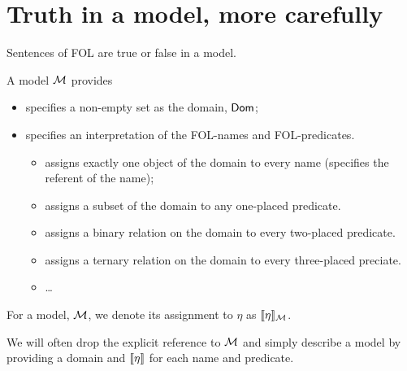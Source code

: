 \chapter{Truth in a model, more carefully}\label{ch:FOL semantics properly}
Sentences of FOL are true or false in a model. 
\begin{highlighted}A model ${\mathcal{M}}$ provides \begin{itemize}
		\item specifies a non-empty set as the domain, $\mathsf{Dom}$;
		\item specifies an interpretation of the FOL-names and FOL-predicates. 
		\begin{itemize}
			\item assigns exactly one object of the domain to every name (specifies the referent of the name);
			\item assigns a subset of the domain to any one-placed predicate.
			\item assigns a binary relation on the domain to every two-placed predicate.
			\item assigns a ternary relation on the domain to every three-placed preciate.
			\item \ldots
		\end{itemize}
\end{itemize}\end{highlighted}


\begin{definition}For a model, ${\mathcal{M}}$, we denote its assignment to $\eta$ as $\llbracket \eta\rrbracket_{\mathcal{M}}$. 
	
	We will often drop the explicit reference to ${\mathcal{M}}$ and simply describe a model by providing a domain and $\llbracket \eta\rrbracket$ for each name and predicate.\end{definition}


